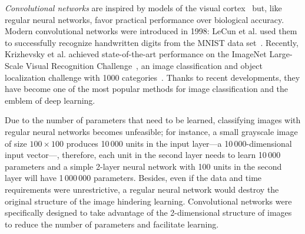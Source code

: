 \emph{Convolutional networks} are inspired by models of the visual cortex~\cite{Fukushima1980} but, like regular neural networks, favor practical performance over biological accuracy.
Modern convolutional networks were introduced in 1998: LeCun et al. used them to successfully recognize handwritten digits from the MNIST data set~\cite{LeCun1998}.
Recently, Krizhevsky et al. achieved state-of-the-art performance on the ImageNet Large-Scale Visual Recognition Challenge~\cite{Krizhevsky2012}, an image classification and object localization challenge with 1000 categories~\cite{Russakovsky2015}. Thanks to recent developments, they have become one of the most popular methods for image classification and the emblem of deep learning.


Due to the number of parameters that need to be learned, classifying images with regular neural networks becomes unfeasible; for instance, a small grayscale image of size $100\times100$ produces 10\,000 units in the input layer---a 10\,000-dimensional input vector---, therefore, each unit in the second layer needs to learn 10\,000 parameters and a simple 2-layer neural network with 100 units in the second layer will have 1\,000\,000 parameters. Besides, even if the data and time requirements were unrestrictive, a regular neural network would destroy the original structure of the image hindering learning. Convolutional networks were specifically designed to take advantage of the 2-dimensional structure of images to reduce the number of parameters and facilitate learning.

